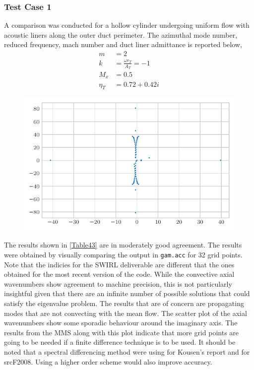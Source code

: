 \subsubsection{Test Case 1}
A comparison was conducted for a hollow cylinder undergoing uniform flow with
acoustic liners along the outer duct perimeter. The azimuthal mode number, reduced 
frequency, mach number and duct liner admittance is reported below,
\begin{align*}
    m &= 2 \\
    k &= \frac{\omega r_T}{A_T} = -1 \\
    M_x &= 0.5 \\
    \eta_T &= 0.72 + 0.42i
\end{align*} 
\begin{figure}[h!]
    \centering
    \includegraphics[width=\textwidth]{Chapter-5-Results/tex-outputs/gam.acc.scatter.Table4.3.pdf}
\end{figure}







The results shown in \ref{Table43} are in moderately good agreement. The 
results were obtained by visually comparing the output in \verb|gam.acc| for 32 
grid points. Note that the indicies for the SWIRL deliverable are different that 
the ones obtained for the most recent version of the code. While the 
convective axial wavenumbers show agreement to machine precision, this is not 
particularly insightful given that there are an infinite number of possible solutions 
that could satisfy the eigenvalue problem. The results that are of concern 
are propagating modes that are not convecting with the mean flow.  The scatter plot
of the axial wavenumbers show some sporadic behaviour around the imaginary axis.
The results from the MMS along with this plot indicate that more grid points are going 
to be needed if a finite difference technique is to be used. It should be 
noted that a spectral differencing method were using for Kousen's report and for
srcF2008. Using a higher order scheme would also improve accuracy.



